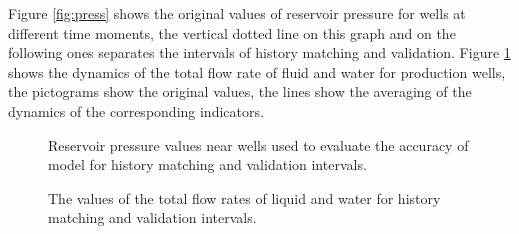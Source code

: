 \documentclass[
11pt,%
tightenlines,%
twoside,%
onecolumn,%
nofloats,%
nobibnotes,%
nofootinbib,%
superscriptaddress,%
noshowpacs,%
centertags]%
{revtex4}
\begin{document}
Figure \ref{fig:press} shows the original values of reservoir
pressure for wells at different time moments, the vertical dotted
line on this graph and on the following ones separates the intervals
of history matching and validation. Figure \ref{fig:qlic} shows the
dynamics of the total flow rate of fluid and water for production
wells, the pictograms show the original values, the lines show the
averaging of the dynamics of the corresponding indicators.
\begin{figure}
    \begin{minipage}[h]{0.48\linewidth}
\caption{Reservoir pressure values near wells used to evaluate the
accuracy of model for history matching and validation
intervals.}
      \label{fig:press}
    \end{minipage} \hfill
    \begin{minipage}[h]{0.48\linewidth}
\caption{The values of the total flow rates of liquid and water for
history matching and validation intervals.}
      \label{fig:qlic}
    \end{minipage}
\end{figure}
\end{document}

